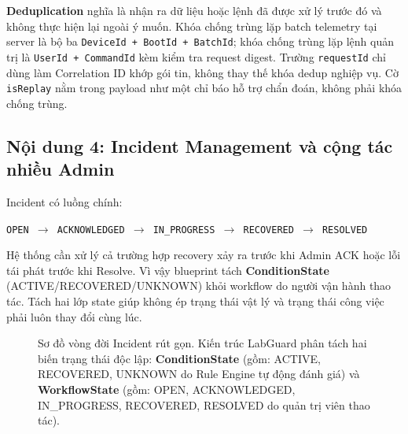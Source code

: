 \begin{beginnerbox}
\textbf{Deduplication} nghĩa là nhận ra dữ liệu hoặc lệnh đã được xử lý trước đó và không thực hiện lại ngoài ý muốn. Khóa chống trùng lặp batch telemetry tại server là bộ ba \texttt{DeviceId + BootId + BatchId}; khóa chống trùng lặp lệnh quản trị là \texttt{UserId + CommandId} kèm kiểm tra request digest. Trường \texttt{requestId} chỉ dùng làm Correlation ID khớp gói tin, không thay thế khóa dedup nghiệp vụ. Cờ \texttt{isReplay} nằm trong payload như một chỉ báo hỗ trợ chẩn đoán, không phải khóa chống trùng.
\end{beginnerbox}

\subsection{Nội dung 4: Incident Management và cộng tác nhiều Admin}

Incident có luồng chính:
\begin{center}
\texttt{OPEN $\rightarrow$ ACKNOWLEDGED $\rightarrow$ IN\_PROGRESS $\rightarrow$ RECOVERED $\rightarrow$ RESOLVED}
\end{center}

Hệ thống cần xử lý cả trường hợp recovery xảy ra trước khi Admin ACK hoặc lỗi tái phát trước khi Resolve. Vì vậy blueprint tách \textbf{ConditionState} (ACTIVE/RECOVERED/UNKNOWN) khỏi workflow do người vận hành thao tác. Tách hai lớp state giúp không ép trạng thái vật lý và trạng thái công việc phải luôn thay đổi cùng lúc.

\begin{figure}[!ht]
\centering
{}
\caption{Sơ đồ vòng đời Incident rút gọn. Kiến trúc LabGuard phân tách hai biến trạng thái độc lập: \textbf{ConditionState} (gồm: ACTIVE, RECOVERED, UNKNOWN do Rule Engine tự động đánh giá) và \textbf{WorkflowState} (gồm: OPEN, ACKNOWLEDGED, IN\_PROGRESS, RECOVERED, RESOLVED do quản trị viên thao tác).}
\label{fig:incident-state}
\end{figure}

